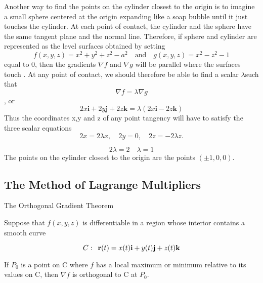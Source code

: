 \documentclass[12pt,a4paper,draft]{article}
\newenvironment{ruleBox}[1]{\begin{rulebox}{#1}}{\end{rulebox}\vspace{1\baselineskip}}
\begin{document}
\begin{example}
\begin{solution}
        \end{solution}
        \begin{solution}
            Another way to find the points on the cylinder closest to the origin is to imagine a small sphere centered at the origin expanding like a soap bubble until it just touches the cylinder. At each point of contact, the cylinder and the sphere have the same tangent plane and the normal line. Therefore, if sphere and cylinder are represented as the level surfaces obtained by setting
            \[f(x,y,z) = x^2 + y^2 + z^2 -a^2 \quad \textrm{and} \quad g(x,y,z) = x^2 - z^2 -1\]
            equal to 0, then the gradients \(\nabla f\) and \(\nabla g\) will be parallel where the surfaces touch . At any point of contact, we should therefore be able to find a scalar \(\lambda\)such that
            \[\nabla f = \lambda \nabla g\],
            or
            \[2x\mathbf{i} + 2y\mathbf{j} + 2z\mathbf{k} = \lambda (2x\mathbf{i} -2z \mathbf{k} )\]
            Thus the coordinates x,y and z of any point tangency will have to satisfy the three scalar equations
            \[2x = 2\lambda x, \quad 2y = 0, \quad 2z = -2 \lambda z.\]

            \[2\lambda = 2 \quad \lambda =1\]
            The points on the cylinder closest to the origin are the points \((\pm 1, 0,0)\).



        \end{solution}

        
\end{example}


\subsection{The Method of Lagrange Multipliers}

\begin{ruleBox}{The Orthogonal Gradient Theorem}

    Suppose that \(f(x,y,z)\) is differentiable in a region whose interior contains a smooth curve

    \[C: \hspace*{0.5em} \mathbf{r}(t) = x(t)\mathbf{i} + y(t)\mathbf{j} + z(t)\mathbf{k}\]

    If \(P_0\) is a point on C where \(f\) has a local maximum or minimum relative to its values on C, then \(\nabla f\) is orthogonal to C at \(P_0\).
    
\end{ruleBox}
\end{document}
